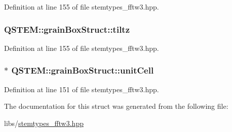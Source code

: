 Definition at line 155 of file stemtypes\-\_\-fftw3.\-hpp.

\hypertarget{struct_q_s_t_e_m_1_1grain_box_struct_a097aa6491b350d62fb041a9ce7a407e9}{
\subsubsection[{tiltz}]{ Q\-S\-T\-E\-M\-::grain\-Box\-Struct\-::tiltz}}\label{struct_q_s_t_e_m_1_1grain_box_struct_a097aa6491b350d62fb041a9ce7a407e9}


Definition at line 155 of file stemtypes\-\_\-fftw3.\-hpp.

\hypertarget{struct_q_s_t_e_m_1_1grain_box_struct_a225293e62a2d3d01731dc1de05e8192f}{
\subsubsection[{unit\-Cell}]{$\ast$ Q\-S\-T\-E\-M\-::grain\-Box\-Struct\-::unit\-Cell}}\label{struct_q_s_t_e_m_1_1grain_box_struct_a225293e62a2d3d01731dc1de05e8192f}


Definition at line 151 of file stemtypes\-\_\-fftw3.\-hpp.



The documentation for this struct was generated from the following file\-:\begin{DoxyCompactItemize}
\item 
libs/\hyperlink{stemtypes__fftw3_8hpp}{stemtypes\-\_\-fftw3.\-hpp}\end{DoxyCompactItemize}

